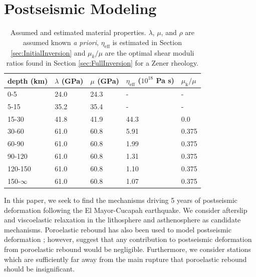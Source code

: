 \documentclass[review]{elsarticle}
\begin{document}
\section{Postseismic Modeling}\label{sec:Model}

\begin{table}\label{tab:MaterialProperties}
\begin{tabular} {l l l l l}
depth (km) &$\lambda$ (GPa)&$\mu$ (GPa)&$\eta_\mathrm{eff}$ ($10^{18}$ Pa s) & $\mu_\mathrm{k}/\mu$\\ \hline
0-5 & 24.0 & 24.3 & - & -\\
5-15 & 35.2 & 35.4 & - & -\\
15-30 & 41.8 & 41.9 & 44.3 & 0.0\\
30-60 & 61.0 & 60.8 & 5.91 & 0.375\\
60-90 & 61.0 & 60.8 & 1.99 & 0.375\\
90-120 & 61.0 & 60.8 & 1.31 & 0.375\\
120-150 & 61.0 & 60.8 & 1.10 & 0.375\\
150-$\infty$ & 61.0 & 60.8 & 1.07 & 0.375\\
\end{tabular}
\caption{Assumed and estimated material properties. $\lambda$, $\mu$, and $\rho$ are assumed known \textit{a priori}, $\eta_\mathrm{eff}$ is estimated in Section \ref{sec:InitialInversion} and $\mu_k/\mu$ are the optimal shear moduli ratios found in Section \ref{sec:FullInversion} for a Zener rheology.} 

\end{table}
In this paper, we seek to find the mechanisms driving 5 years of postseismic deformation following the El Mayor-Cucapah earthquake. We consider afterslip and viscoelastic relaxation in the lithosphere and asthenosphere as candidate mechanisms.  Poroelastic rebound has also been used to model postseismic deformation \citep[e.g.][]{Jonsson2003}; however, \citet{Gonzalez-ortega2014} suggest that any contribution to postseismic deformation from poroelastic rebound would be negligible. Furthermore, we consider stations which are sufficiently far away from the main rupture that poroelastic rebound should be insignificant.  
\end{document}
